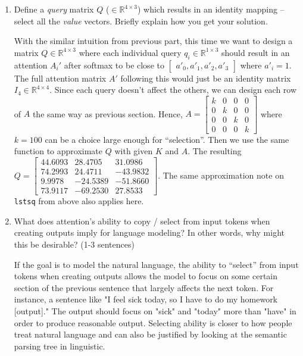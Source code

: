 \documentclass{article}
\newenvironment{solution}{\color{blue}}{}
\begin{document}
\begin{enumerate}
  \item Define a \textit{query} matrix $Q$ ($\in \mathbb{R}^{4 \times 3}$) which results in an identity mapping -- select all the \textit{value} vectors. Briefly explain how you get your solution.
  
  \begin{solution}
    With the similar intuition from previous part, this time we want to design a matrix $Q \in \mathbb{R}^{4 \times 3}$ where each individual query $q_i \in \mathbb{R}^{1 \times 3}$ should result in an attention $A_i'$ after softmax to be close to $\begin{bmatrix}
      a'_0, a'_1, a'_2, a'_3
    \end{bmatrix}$ where $a'_i = 1$. The full attention matrix $A'$ following this would just be an identity matrix $I_4 \in \mathbb{R}^{4 \times 4}$. Since each query doesn't affect the others, we can design each row of $A$ the same way as previous section. Hence,
    $A = \begin{bmatrix}
      k & 0 & 0 & 0
      \\ 0 & k & 0 & 0
      \\ 0 & 0 & k & 0
      \\ 0 & 0 & 0 & k
    \end{bmatrix}$ where $k = 100$ can be a choice large enough for ``selection''. Then we use the same function to approximate $Q$ with given $K$ and $A$. The resulting $Q = \begin{bmatrix}
      44.6093 &  28.4705 &  31.0986 \\
      74.2993 &  24.4711 & -43.9832 \\
      9.9978 & -24.5389 & -51.8660 \\ 
      73.9117 & -69.2530 & 27.8533
    \end{bmatrix}$. The same approximation note on \texttt{lstsq} from above also applies here.
  \end{solution}


  \item What does attention's ability to copy / select from input tokens when creating outputs imply for language modeling? In other words, why might this be desirable? (1-3 sentences)
  
  \begin{solution}
    If the goal is to model the natural language, the ability to ``select'' from input tokens when creating outputs allows the model to focus on some certain section of the previous sentence that largely affects the next token. For instance, a sentence like "I feel sick today, so I have to do my homework [output]." The output should focus on "sick" and "today" more than "have" in order to produce reasonable output. Selecting ability is closer to how people treat natural language and can also be justified by looking at the semantic parsing tree in linguistic.
  \end{solution}

\end{enumerate}
\end{document}
